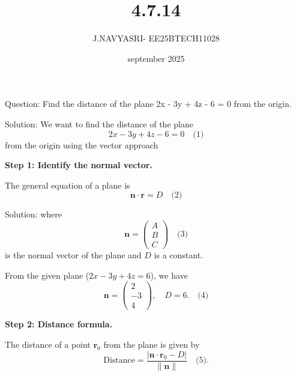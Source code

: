 \documentclass{beamer}
\title %
{4.7.14}
\date{september 2025}
\author %
{J.NAVYASRI- EE25BTECH11028}
\begin{document}
\frame{\titlepage}
\begin{frame}{Question:}
Find the distance of the plane 
2x - 3y + 4z - 6 = 0
from the origin.
\end{frame}

\begin{frame}{Solution:}
We want to find the distance of the plane 
\begin{equation}
2x - 3y + 4z - 6 = 0 \quad \text{(1)}
\end{equation} 
from the origin using the vector approach

\vspace{0.5em}
\textbf{Step 1: Identify the normal vector.}

The general equation of a plane is 
\begin{equation}
\mathbf{n} \cdot \mathbf{r} = D \quad \text{(2)}
\end{equation}
\end{frame}

\begin{frame}{Solution:}
where 
\begin{equation}
\mathbf{n} = \begin{pmatrix} A \\ B \\ C \end{pmatrix} \quad \text{(3)}
\end{equation} 
is the normal vector of the plane and $D$ is a constant. 

From the given plane ($2x - 3y + 4z = 6$), we have
\begin{equation}
\mathbf{n} = \begin{pmatrix} 2 \\ -3 \\ 4 \end{pmatrix}, \quad D = 6. \quad \text{(4)}
\end{equation}

\vspace{0.5em}
\textbf{Step 2: Distance formula.}

The distance of a point $\mathbf{r}_0$ from the plane is given by
\begin{equation}
\text{Distance} = \frac{|\mathbf{n} \cdot \mathbf{r}_0 - D|}{\|\mathbf{n}\|} \quad \text{(5)}.
\end{equation}
\end{frame}
\end{document}
